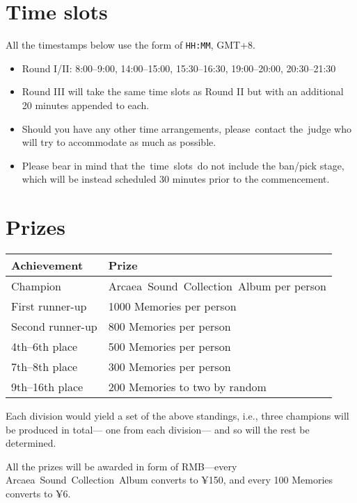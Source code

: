\documentclass{article}
\begin{document}
\section{Time slots}

All the timestamps below use the form of
\texttt{HH:MM}, GMT+8.

\begin{itemize}
	\item Round I/II: 8:00--9:00, 14:00--15:00, 15:30--16:30, 19:00--20:00, 20:30--21:30

	\item Round III will take the same time slots as Round II
	      but with an additional 20 minutes appended to each.

	\item Should you have any other time arrangements,
	      please contact the judge who will
	      try to accommodate as much as possible.

	\item Please bear in mind that
	      the time slots do not include the ban/pick stage,
	      which will be instead scheduled 30 minutes prior to the commencement.
\end{itemize}

\section{Prizes}

\begin{table}[!htbp]
	\centering
	\begin{tabular}{ll}
		\hline
		Achievement  %
		                 & Prize                                    \\ \hline
		Champion         & Arcaea Sound Collection Album per person \\
		First runner-up  & 1000 Memories per person                 \\
		Second runner-up & 800 Memories per person                  \\
		4th--6th place   & 500 Memories per person                  \\
		7th--8th place   & 300 Memories per person                  \\
		9th--16th place  & 200 Memories to two by random            \\ \hline
	\end{tabular}
\end{table}

Each division would yield a set of the above standings,
i.e.,
three champions will be produced in total---%
one from each division---%
and so will the rest be determined.

All the prizes will be awarded in form of
RMB---every Arcaea Sound Collection Album converts to ¥150,
and every 100 Memories converts to ¥6.
\end{document}
